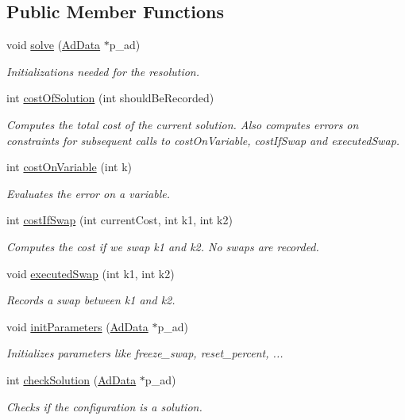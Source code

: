 \subsection*{\-Public \-Member \-Functions}
\begin{DoxyCompactItemize}
\item 
void \hyperlink{classMagicSquare_a78393622fa3f92fe35d1dd0e97e3c0df}{solve} (\hyperlink{classAdData}{\-Ad\-Data} $\ast$p\-\_\-ad)
\begin{DoxyCompactList}\small\item\em \-Initializations needed for the resolution. \end{DoxyCompactList}\item 
int \hyperlink{classMagicSquare_a8c4a080666b26014b9ed1d8fc8a97470}{cost\-Of\-Solution} (int should\-Be\-Recorded)
\begin{DoxyCompactList}\small\item\em \-Computes the total cost of the current solution. \-Also computes errors on constraints for subsequent calls to cost\-On\-Variable, cost\-If\-Swap and executed\-Swap. \end{DoxyCompactList}\item 
int \hyperlink{classMagicSquare_ae57a2b1183f82870cdd63fddeeb078fe}{cost\-On\-Variable} (int k)
\begin{DoxyCompactList}\small\item\em \-Evaluates the error on a variable. \end{DoxyCompactList}\item 
int \hyperlink{classMagicSquare_a3904934cb8ef871455a57dd0dd9be7ea}{cost\-If\-Swap} (int current\-Cost, int k1, int k2)
\begin{DoxyCompactList}\small\item\em \-Computes the cost if we swap k1 and k2. \-No swaps are recorded. \end{DoxyCompactList}\item 
void \hyperlink{classMagicSquare_a63c7d1ad48a11ff2e2b1889ae883cc0d}{executed\-Swap} (int k1, int k2)
\begin{DoxyCompactList}\small\item\em \-Records a swap between k1 and k2. \end{DoxyCompactList}\item 
void \hyperlink{classMagicSquare_a822df6377b8511394629d796ab8bb690}{init\-Parameters} (\hyperlink{classAdData}{\-Ad\-Data} $\ast$p\-\_\-ad)
\begin{DoxyCompactList}\small\item\em \-Initializes parameters like freeze\-\_\-swap, reset\-\_\-percent, ... \end{DoxyCompactList}\item 
int \hyperlink{classMagicSquare_a8370790cee1a866ef1e1cead34f2fb69}{check\-Solution} (\hyperlink{classAdData}{\-Ad\-Data} $\ast$p\-\_\-ad)
\begin{DoxyCompactList}\small\item\em \-Checks if the configuration is a solution. \end{DoxyCompactList}\end{DoxyCompactItemize}
